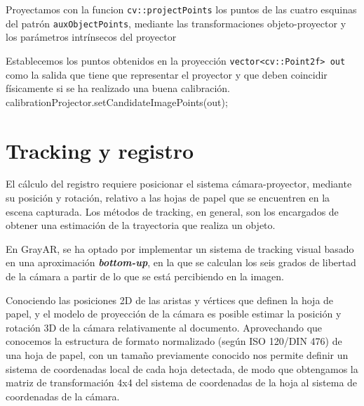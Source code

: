 Proyectamos con la funcion \texttt{cv::projectPoints} los puntos de las cuatro esquinas del patrón \texttt{auxObjectPoints}, mediante las transformaciones objeto-proyector y los parámetros intrínsecos del proyector


Establecemos los puntos obtenidos en la proyección \texttt{vector<cv::Point2f> out} como la salida que tiene que representar el proyector y que deben coincidir físicamente si se ha realizado una buena calibración. calibrationProjector.setCandidateImagePoints(out);


\section{Tracking y registro}
El cálculo del registro requiere posicionar el sistema cámara-proyector, mediante su posición y
rotación, relativo a las hojas de papel que se encuentren en la escena capturada. Los métodos de
tracking, en general, son los encargados de obtener una estimación de la trayectoria que realiza un
objeto.

En GrayAR, se ha optado por implementar un sistema de tracking visual basado en una aproximación \textbf{\textit{bottom-up}}\cite{Marimon}, en la que se calculan los seis grados de libertad de la cámara a partir de lo que se está
percibiendo en la imagen.




Conociendo las posiciones 2D de las aristas y vértices que definen la hoja de papel, y el modelo de
proyección de la cámara es posible estimar la posición y rotación 3D de la cámara relativamente al
documento. Aprovechando que conocemos la estructura de formato normalizado (según ISO 120/DIN 476) de una
hoja de papel, con un tamaño previamente conocido nos permite definir un sistema de coordenadas
local de cada hoja detectada, de modo que obtengamos la matriz de transformación 4x4 del sistema de
coordenadas de la hoja al sistema de coordenadas de la cámara.

